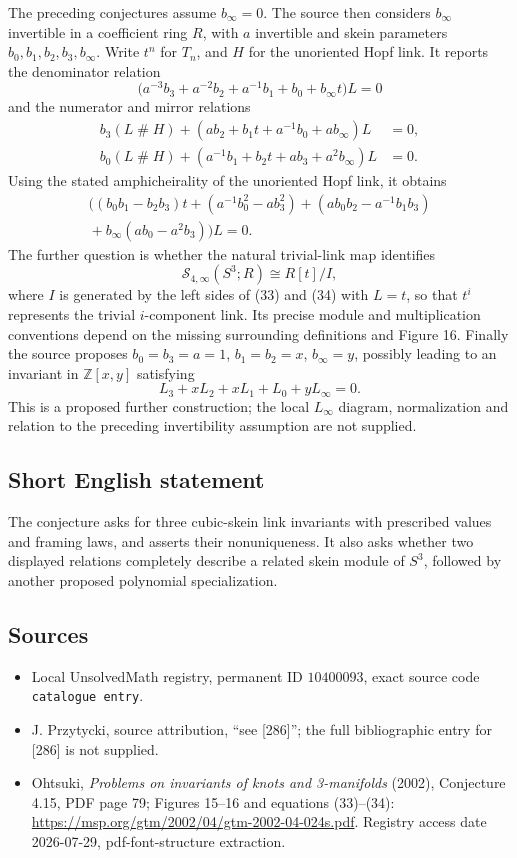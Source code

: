 \documentclass[11pt]{article}
\newcommand{\Z}{\mathbb{Z}}
\begin{document}
The preceding conjectures assume \(b_\infty=0\). The source then considers \(b_\infty\) invertible in a coefficient ring \(R\), with \(a\) invertible and skein parameters \(b_0,b_1,b_2,b_3,b_\infty\). Write \(t^n\) for \(T_n\), and \(H\) for the unoriented Hopf link. It reports the denominator relation
\[\bigl(a^{-3}b_3+a^{-2}b_2+a^{-1}b_1+b_0+b_\infty t\bigr)L=0\tag{33}\]
and the numerator and mirror relations
\begin{align*}
b_3(L\mathbin{\#}H)+(ab_2+b_1t+a^{-1}b_0+ab_\infty)L&=0,\\
b_0(L\mathbin{\#}H)+(a^{-1}b_1+b_2t+ab_3+a^2b_\infty)L&=0.
\end{align*}
Using the stated amphicheirality of the unoriented Hopf link, it obtains
\[\begin{split}
\bigl((b_0b_1-b_2b_3)t+(a^{-1}b_0^2-ab_3^2)
 +(ab_0b_2-a^{-1}b_1b_3)\\
 {}+b_\infty(ab_0-a^2b_3)\bigr)L=0.\tag{34}
\end{split}\]
The further question is whether the natural trivial-link map identifies
\[\mathcal S_{4,\infty}(S^3;R)\cong R[t]/I,\]
where \(I\) is generated by the left sides of (33) and (34) with \(L=t\), so that \(t^i\) represents the trivial \(i\)-component link. Its precise module and multiplication conventions depend on the missing surrounding definitions and Figure 16. Finally the source proposes \(b_0=b_3=a=1\), \(b_1=b_2=x\), \(b_\infty=y\), possibly leading to an invariant in \(\Z[x,y]\) satisfying
\[L_3+xL_2+xL_1+L_0+yL_\infty=0.\]
This is a proposed further construction; the local \(L_\infty\) diagram, normalization and relation to the preceding invertibility assumption are not supplied.
\subsection{Short English statement}
The conjecture asks for three cubic-skein link invariants with prescribed values and framing laws, and asserts their nonuniqueness. It also asks whether two displayed relations completely describe a related skein module of \(S^3\), followed by another proposed polynomial specialization.
\subsection{Sources}
\begin{itemize}
\item Local UnsolvedMath registry, permanent ID \(10400093\), exact source code \texttt{catalogue entry}.
\item J. Przytycki, source attribution, ``see [286]''; the full bibliographic entry for [286] is not supplied.
\item Ohtsuki, \emph{Problems on invariants of knots and 3-manifolds} (2002), Conjecture 4.15, PDF page 79; Figures 15--16 and equations (33)--(34): \url{https://msp.org/gtm/2002/04/gtm-2002-04-024s.pdf}. Registry access date 2026-07-29, pdf-font-structure extraction.
\end{itemize}
\end{document}
